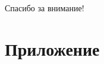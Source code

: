 \documentclass[10pt]{beamer}
\begin{document}
\begin{frame}
\Huge{\centerline{\color{blue} Спасибо за внимание!}}
\end{frame}

\appendix
\section{Приложение}
\end{document}

